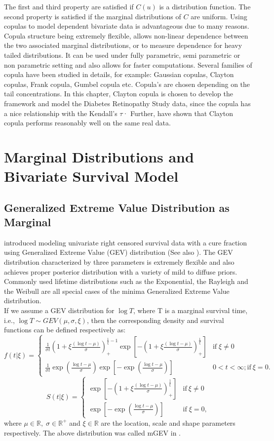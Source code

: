 \documentclass[11pt]{article}
\theoremstyle{remboldstyle}
\begin{document}
The first and third property are satisfied if $C(u)$ is a distribution function. The second property is satisfied if the marginal distributions of $C$ are uniform. Using copulas to model dependent bivariate data is advantageous due to many reasons. Copula structure being extremely flexible, allows non-linear dependence between the two associated marginal distributions, or to measure dependence for heavy tailed distributions. It can be used under fully parametric, semi parametric or non parametric setting and also allows for faster computations. Several families of copula have been studied in details, for example: Gaussian copulas, Clayton copulas, Frank copula, Gumbel copula etc. Copula's are chosen depending on the tail concentrations. In this chapter, Clayton copula is chosen to develop the framework and model the Diabetes Retinopathy Study data, since the copula has a nice relationship with the Kendall's $\tau$· Further, \cite{romeo:tanaka:2006} have shown that Clayton copula performs reasonably well on the same real data.
\section{Marginal Distributions and Bivariate Survival Model}
\label{sec:marg}
\subsection{Generalized Extreme Value Distribution as Marginal}
\noindent
\cite{roy:roy:dey:2013} introduced modeling univariate right censored survival data with a cure fraction using Generalized Extreme Value (GEV) distribution (See also \cite{roy:dey:2014}). The GEV distribution characterized by three parameters is extremely flexible and also achieves proper posterior distribution with a variety of mild to diffuse priors. Commonly used lifetime distributions such as the Exponential, the Rayleigh and the Weibull are all special cases of the minima Generalized Extreme Value distribution.\\
If we assume a GEV distribution for $\log T$, where T is a marginal survival time, i.e., $\log T \sim GEV (\mu,\sigma,\xi)$, then the corresponding density and survival functions can be defined respectively as:\\
\[
f(t|\xi)=\begin{cases}
\frac{1}{\sigma t}(1+\xi\frac{(\log t - \mu)}{\sigma})_{+}^{\frac{1}{\xi}-1}\exp[-(1+\xi\frac{(\log t - \mu)}{\sigma})_{+}^{\frac{1}{\xi}}] & \mbox{if} \; \xi  \neq 0\\
\frac{1}{\sigma t}\exp(\frac{\log t - \mu}{\sigma})\exp[-\exp(\frac{\log t - \mu}{\sigma})] & 0<t<\infty; \mbox{if}\ \xi=0.
\end{cases}
\]
\[
S(t|\xi)=\begin{cases}
\exp[-(1+\xi\frac{(\log t - \mu)}{\sigma})_{+}^{\frac{1}{\xi}}]  & \mbox{if}\ \xi\neq0\\
\exp[-\exp(\frac{\log t - \mu}{\sigma})] & \mbox{if} \; \xi=0,
\end{cases}
\]
where $\mu\in \mathbb{R},\; \sigma\in \mathbb{R}^+$ and $\xi\in \mathbb{R}$ are the location, scale and shape parameters respectively. The above distribution was called mGEV in \cite{roy:roy:dey:2013}.
\end{document}
